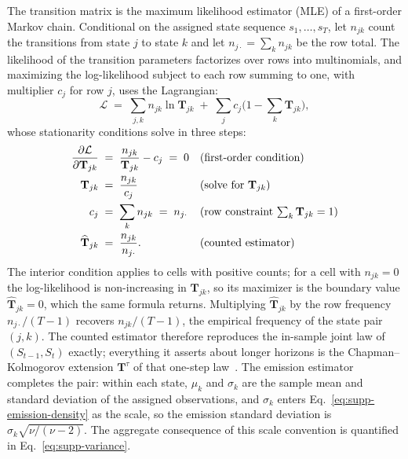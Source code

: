 The transition matrix is the maximum likelihood estimator (MLE) of a
first-order Markov chain. Conditional on the assigned state sequence
$s_1, \dots, s_T$, let $n_{jk}$ count the transitions from state $j$
to state $k$ and let $n_{j \cdot} = \sum_k n_{jk}$ be the row total.
The likelihood of the transition parameters factorizes over rows into
multinomials, and maximizing the log-likelihood subject to each row
summing to one, with multiplier $c_j$ for row $j$, uses the
Lagrangian:
\begin{equation}
  \mathcal{L} \;=\; \sum_{j, k} n_{jk} \ln \mathbf{T}_{jk}
    \;+\; \sum_{j} c_{j} \Big(1 - \sum_{k} \mathbf{T}_{jk}\Big),
  \label{eq:supp-lagrangian}
\end{equation}
whose stationarity conditions solve in three steps:
\begin{align}
  \frac{\partial \mathcal{L}}{\partial \mathbf{T}_{jk}}
   &\;=\; \frac{n_{jk}}{\mathbf{T}_{jk}} - c_j \;=\; 0
     && \text{(first-order condition)} \notag \\
  \mathbf{T}_{jk}
   &\;=\; \frac{n_{jk}}{c_j}
     && \text{(solve for $\mathbf{T}_{jk}$)} \notag \\
  c_j
   &\;=\; \sum_{k} n_{jk} \;=\; n_{j \cdot}
     && \text{(row constraint $\textstyle\sum_k \mathbf{T}_{jk} = 1$)} \notag \\
  \widehat{\mathbf{T}}_{jk}
   &\;=\; \frac{n_{jk}}{n_{j \cdot}}.
     && \text{(counted estimator)}
  \label{eq:supp-markov-mle}
\end{align}
The interior condition applies to cells with positive counts; for a
cell with $n_{jk} = 0$ the log-likelihood is non-increasing in
$\mathbf{T}_{jk}$, so its maximizer is the boundary value
$\widehat{\mathbf{T}}_{jk} = 0$, which the same formula returns.
Multiplying $\widehat{\mathbf{T}}_{jk}$ by the row frequency
$n_{j\cdot}/(T-1)$ recovers $n_{jk}/(T-1)$, the empirical frequency of
the state pair $(j, k)$. The counted estimator therefore reproduces
the in-sample joint law of $(S_{t-1}, S_t)$ exactly; everything it
asserts about longer horizons is the Chapman--Kolmogorov extension
$\mathbf{T}^\tau$ of that one-step law~\cite{bilmes1998,
grinsteadSnell1997}. The emission estimator completes the pair: within
each state, $\mu_k$ and $\sigma_k$ are the sample mean and standard
deviation of the assigned observations, and $\sigma_k$ enters
Eq.~\eqref{eq:supp-emission-density} as the scale, so the emission
standard deviation is $\sigma_k \sqrt{\nu/(\nu - 2)}$. The aggregate
consequence of this scale convention is quantified in
Eq.~\eqref{eq:supp-variance}.

